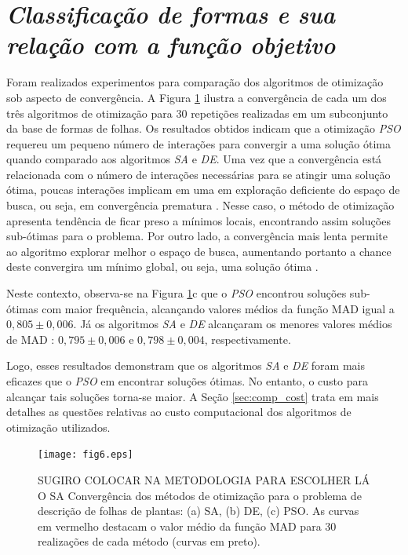 {\color{blue}

\section{\emph{Classificação de formas e sua relação com  a função objetivo}}
Foram realizados experimentos para comparação dos algoritmos de otimização sob aspecto de convergência. A Figura \ref{fig:converge} ilustra a convergência de cada um dos três algoritmos de otimização para $30$ repetições realizadas em um subconjunto da base de formas de folhas. Os resultados obtidos indicam que a otimização \emph{PSO} requereu um pequeno número de interações para convergir a uma solução ótima quando comparado aos algoritmos \emph{SA} e \emph{DE}. Uma vez que a convergência está relacionada com o número de interações necessárias para se atingir uma solução ótima, poucas interações implicam em uma em exploração deficiente do espaço de busca, ou seja, em convergência prematura . Nesse caso, o método de otimização apresenta tendência de ficar preso a mínimos locais, encontrando assim soluções sub-ótimas para o problema. Por outro lado, a convergência mais lenta permite ao algoritmo explorar melhor o espaço de busca, aumentando portanto a chance deste convergira um mínimo global, ou seja, uma solução ótima .
 
Neste contexto, observa-se na Figura \ref{fig:converge}c que o \emph{PSO} encontrou soluções sub-ótimas com maior frequência, alcançando valores médios da função MAD  igual a $0,805 \pm 0,006$.  Já os algoritmos \emph{SA} e \emph{DE} alcançaram os menores valores médios de MAD : $0,795 \pm 0,006$ e $0,798 \pm 0,004$, respectivamente. 

Logo, esses resultados demonstram que os algoritmos \emph{SA} e \emph{DE} foram mais eficazes que o \emph{PSO} em encontrar soluções ótimas. No entanto, o custo para alcançar tais soluções torna-se maior. A Seção \ref{sec:comp_cost} trata em mais detalhes as questões relativas ao custo computacional dos algoritmos de otimização utilizados.

\begin{figure}[!htb]
\caption{\label{fig:converge}{\color{red} SUGIRO COLOCAR NA METODOLOGIA PARA ESCOLHER LÁ O SA} Convergência dos métodos de otimização para o problema de descrição de folhas de plantas: (a) SA, (b) DE, (c) PSO. As curvas em vermelho destacam o valor médio da função MAD para $30$ realizações de cada método (curvas em preto). }
\texttt{[image: fig6.eps]}
\end{figure}

}
